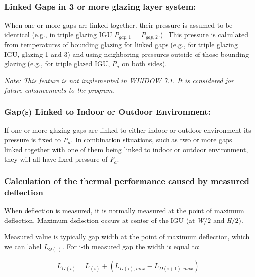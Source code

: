 \subsubsection{Linked Gaps in 3 or more glazing layer system:}\label{linked-gaps-in-3-or-more-glazing-layer-system}

When one or more gaps are linked together, their pressure is assumed to be identical (e.g., in triple glazing IGU \emph{P\(_{gap,1}\)} = \emph{P\(_{gap,2}\)}.)~ This pressure is calculated from temperatures of bounding glazing for linked gaps (e.g., for triple glazing IGU, glazing 1 and 3) and using neighboring pressures outside of those bounding glazing (e.g., for triple glazed IGU, \emph{P\(_{a}\)} on both sides).

\emph{Note: This feature is not implemented in WINDOW 7.1. It is considered for future enhancements to the program.}

\subsubsection{Gap(s) Linked to Indoor or Outdoor Environment:}\label{gaps-linked-to-indoor-or-outdoor-environment}

If one or more glazing gaps are linked to either indoor or outdoor environment its pressure is fixed to \emph{P\(_{a}\)}. In combination situations, such as two or more gaps linked together with one of them being linked to indoor or outdoor environment, they will all have fixed pressure of \emph{P\(_{a}\)}.

\subsubsection{Calculation of the thermal performance caused by measured deflection}\label{calculation-of-the-thermal-performance-caused-by-measured-deflection}

When deflection is measured, it is normally measured at the point of maximum deflection. Maximum deflection occurs at center of the IGU (at \emph{W}/2 and \emph{H}/2).

Measured value is typically gap width at the point of maximum deflection, which we can label \emph{L\(_{G(i)}\)}. For i-th measured gap the width is equal to:

\begin{equation}
{L_{G\left( i \right)}} = {L_{\left( i \right)}} + \left( {{L_{D\left( i \right),max}} - {L_{D\left( {i + 1} \right),max}}} \right)
\end{equation}

